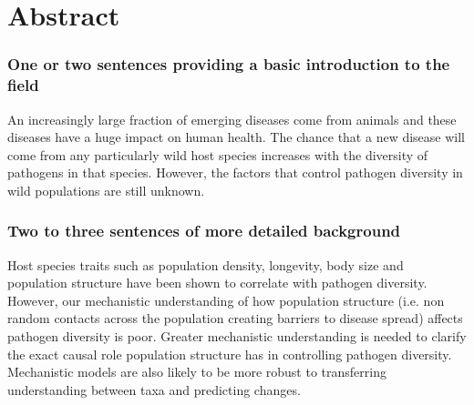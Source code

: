 
\clearpage



\begin{knitrout}
\color{fgcolor}\begin{kframe}
\begin{alltt}
 \hlkwb{<-} 


\hlopt{$}\hlstd{(} \hlstd{=} \hlstd{)}

\hlstd{(}\hlstd{)}
\hlstd{(}\hlstd{)}
\end{alltt}
\end{kframe}
\end{knitrout}





\section{Abstract}


\subsubsection{One or two sentences providing a basic introduction to the field}
An increasingly large fraction of emerging diseases come from animals \cite{jones2008global, taylor2001risk} and these diseases have a huge impact on human health.
The chance that a new disease will come from any particularly wild host species increases with the diversity of pathogens in that species.
However, the factors that control pathogen diversity in wild populations are still unknown.



\subsubsection{Two to three sentences of more detailed background}

Host species traits such as population density, longevity, body size and population structure have been shown to correlate with pathogen diversity.
However, our mechanistic understanding of how population structure (i.e. non random contacts across the population creating barriers to disease spread) affects pathogen diversity is poor.
Greater mechanistic understanding is needed to clarify the exact causal role population structure has in controlling pathogen diversity.
Mechanistic models are also likely to be more robust to transferring understanding between taxa and predicting changes. %

